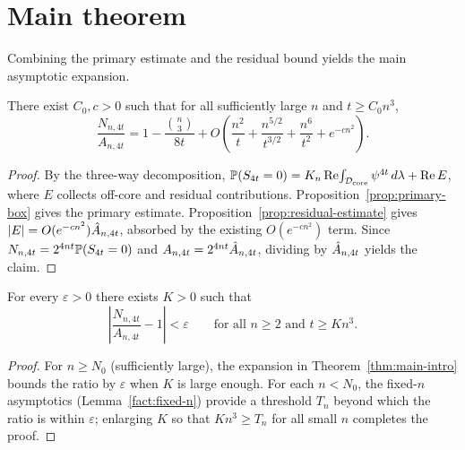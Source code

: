 \chapter{Main theorem}
\label{chap:main-count}

Combining the primary estimate and the residual bound yields the main
asymptotic expansion.

\begin{theorem}\label{thm:main-intro}
\leanok
{}
There exist $C_0,c>0$ such that for all sufficiently large $n$ and
$t\ge C_0 n^3$,
\[
  \frac{N_{n,4t}}{A_{n,4t}}
  =1-\frac{\binom{n}{3}}{8t}
  +O\!\left(\frac{n^2}{t}+\frac{n^{5/2}}{t^{3/2}}
  +\frac{n^6}{t^2}+e^{-cn^2}\right).
\]
\end{theorem}

\begin{proof}\leanok
{}
By the three-way decomposition,
$\mathbb{P}(S_{4t}=0)
=K_n\operatorname{Re}\!\int_{\mathcal{D}_\mathrm{core}}\psi^{4t}\,d\lambda+\operatorname{Re} E$,
where $E$ collects off-core and residual contributions.
Proposition~\ref{prop:primary-box} gives the primary estimate.
Proposition~\ref{prop:residual-estimate} gives
$|E|=O(e^{-cn^2})\hat A_{n,4t}$, absorbed by the existing
$O(e^{-cn^2})$ term.
Since $N_{n,4t}=2^{4nt}\mathbb{P}(S_{4t}=0)$ and
$A_{n,4t}=2^{4nt}\hat A_{n,4t}$, dividing by $\hat A_{n,4t}$ yields the claim.
\end{proof}

\begin{corollary}\label{cor:uniform}
\leanok
{}
For every $\varepsilon>0$ there exists $K>0$ such that
\[
  \left|\frac{N_{n,4t}}{A_{n,4t}}-1\right|<\varepsilon
  \qquad\text{for all } n\ge 2 \text{ and } t\ge Kn^3.
\]
\end{corollary}

\begin{proof}\leanok
{}
For $n\ge N_0$ (sufficiently large), the expansion in
Theorem~\ref{thm:main-intro} bounds the ratio by $\varepsilon$
when $K$ is large enough.
For each $n<N_0$, the fixed-$n$ asymptotics
(Lemma~\ref{fact:fixed-n}) provide a threshold $T_n$ beyond which
the ratio is within $\varepsilon$; enlarging $K$ so that
$Kn^3\ge T_n$ for all small $n$ completes the proof.
\end{proof}
